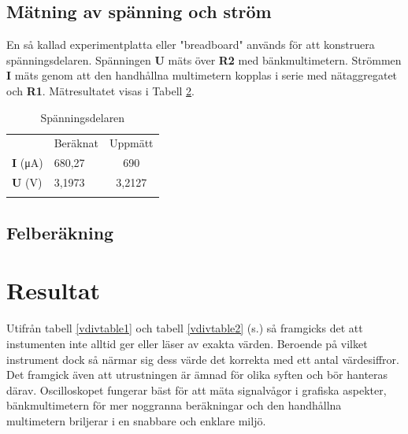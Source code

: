 \documentclass[11pt,a4paper]{article}
\begin{document}
\subsection{Mätning av spänning och ström}\label{meas_multi}
En så kallad experimentplatta eller "breadboard" används för att konstruera
spänningsdelaren. Spänningen \textbf{U} mäts över \textbf{R2} med
bänkmultimetern. Strömmen \textbf{I} mäts genom att den handhållna multimetern
kopplas i serie med nätaggregatet och \textbf{R1}. Mätresultatet visas i
Tabell \ref{vdivtable}.

\begin{table}
    \begin{longtable}[c]{@{}llc@{}}
        \toprule\addlinespace
                              & Beräknat & Uppmätt
        \\\addlinespace
        \midrule\endhead
        \textbf{I} (\si{\uA}) & 680,27   & 690
        \\\addlinespace
        \textbf{U} (\si{\V})  & 3,1973   & 3,2127
        \\\addlinespace
        \bottomrule
        \addlinespace
        \caption{Spänningsdelaren}
        \label{vdivtable}
    \end{longtable}
\end{table}


\subsection{Felberäkning}\label{error}


\section{Resultat}\label{setup}
Utifrån tabell \ref{vdivtable1} och tabell \ref{vdivtable2} (s.\pageref{vdivtable2})
så framgicks det att instumenten inte alltid ger eller läser av exakta värden.
Beroende på vilket instrument dock så närmar sig dess värde det korrekta med ett 
antal värdesiffror. Det framgick även att utrustningen är ämnad för olika syften och 
bör hanteras därav. Oscilloskopet fungerar bäst för att mäta signalvågor i grafiska 
aspekter, bänkmultimetern för mer noggranna beräkningar och den handhållna 
multimetern briljerar i en snabbare och enklare miljö.
\newpage
\end{document}

